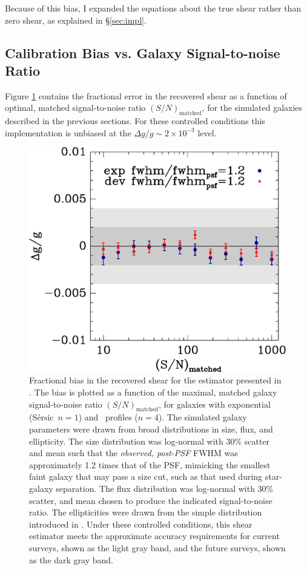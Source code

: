 \documentclass[usegraphicx,usenatbib]{mn2e}
\newcommand{\Msn}{$(S/N)_{\textrm{matched}}$}
\newcommand{\sersic}{S\'{e}rsic}
\newcommand{\lognormscatt}{30}
\begin{document}
Because of this bias, I expanded the equations about the true shear rather than
zero shear, as explained in \S \ref{sec:impl}.

\subsection{Calibration Bias vs. Galaxy Signal-to-noise Ratio} \label{sec:snbias}

Figure \ref{fig:fracerr} contains the fractional error in the recovered shear
as a function of optimal, matched signal-to-noise ratio \Msn, for the simulated
galaxies described in the previous sections.  For these controlled conditions
this implementation is unbiased at the $\Delta g/g \sim 2\times 10^{-3}$ level.

\begin{figure}
 \includegraphics[scale=0.45]{figures/ngmix-fwhm1.2.eps}
 \caption{ Fractional bias in the recovered shear for the estimator presented
     in \citet{ba14}.  The bias is plotted as a function of the maximal, matched
     galaxy signal-to-noise ratio \Msn, for galaxies with exponential (\sersic\
     $n=1$) and \devauc\ profiles ($n=4$).  The simulated galaxy parameters
     were drawn from broad distributions in size, flux, and ellipticity.  The
     size distribution was log-normal with \lognormscatt\% scatter and mean
     such that the {\it observed, post-PSF} FWHM was approximately 1.2 times
     that of the PSF, mimicking the smallest faint galaxy that may pass a size
     cut, such as that used during star-galaxy separation.  The flux
     distribution was log-normal with \lognormscatt\% scatter, and mean chosen
     to produce the indicated signal-to-noise ratio.  The ellipticities were
     drawn from the simple distribution introduced in \citet{ba14}. Under these
     controlled conditions, this shear estimator meets the approximate accuracy
 requirements for current surveys, shown as the light gray band, and the future
 surveys, shown as the dark gray band.}
 \label{fig:fracerr}
\end{figure}
\end{document}
